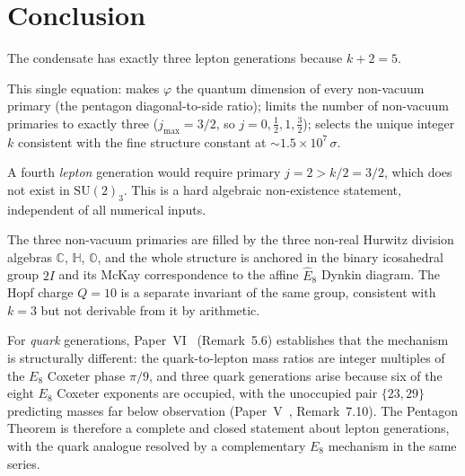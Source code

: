\documentclass[11pt,a4paper]{article}
\theoremstyle{definition}
\theoremstyle{remark}
\newcommand{\vp}{\varphi}
\newcommand{\CC}{\mathbb{C}}
\newcommand{\HH}{\mathbb{H}}
\newcommand{\OO}{\mathbb{O}}
\newcommand{\twoI}{2I}
\newcommand{\Ehat}{\hat{E}_8}
\begin{document}
\section{Conclusion}
\label{F:sec:conclusion}

The condensate has exactly three lepton generations because $k+2=5$.

This single equation:
makes $\vp$ the quantum dimension of every non-vacuum primary
(the pentagon diagonal-to-side ratio);
limits the number of non-vacuum primaries to exactly three
($j_{\max}=3/2$, so $j=0,\tfrac{1}{2},1,\tfrac{3}{2}$);
selects the unique integer $k$ consistent with the fine structure
constant at $\sim1.5\times10^7\,\sigma$.

A fourth \emph{lepton} generation would require primary $j=2>k/2=3/2$,
which does not exist in $\mathrm{SU}(2)_3$.
This is a hard algebraic non-existence statement, independent of
all numerical inputs.

The three non-vacuum primaries are filled by the three non-real
Hurwitz division algebras $\CC$, $\HH$, $\OO$, and the whole
structure is anchored in the binary icosahedral group $\twoI$
and its McKay correspondence to the affine $\Ehat$ Dynkin diagram.
The Hopf charge $Q=10$ is a separate invariant of the same group,
consistent with $k=3$ but not derivable from it by arithmetic.

For \emph{quark} generations, Paper~VI~\cite{Paper6}
(Remark~5.6) establishes that the mechanism
is structurally different: the quark-to-lepton mass ratios are
integer multiples of the $E_8$ Coxeter phase $\pi/9$, and three
quark generations arise because six of the eight $E_8$ Coxeter
exponents are occupied, with the unoccupied pair $\{23,29\}$
predicting masses far below observation (Paper~V~\cite{Paper5},
Remark~7.10).
The Pentagon Theorem is therefore a complete and closed statement
about lepton generations, with the quark analogue resolved by
a complementary $E_8$ mechanism in the same series.
\end{document}
